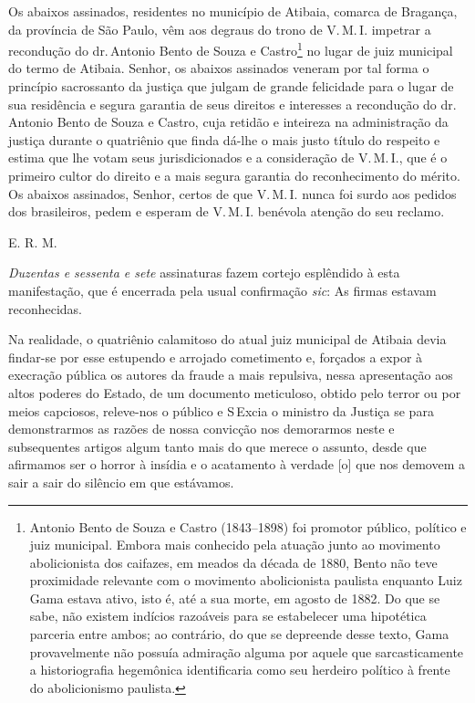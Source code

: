 Os abaixos assinados, residentes no município de Atibaia, comarca de
Bragança, da província de São Paulo, vêm aos degraus do trono de V.\,M.\,I.
impetrar a recondução do dr.\,Antonio Bento de Souza e Castro\footnote{
  Antonio Bento de Souza e Castro (1843--1898) foi promotor público,
  político e juiz municipal. Embora mais conhecido pela atuação junto ao
  movimento abolicionista dos caifazes, em meados da década de 1880,
  Bento não teve proximidade relevante com o movimento abolicionista
  paulista enquanto Luiz Gama estava ativo, isto é, até a sua morte, em
  agosto de 1882. Do que se sabe, não existem indícios razoáveis para se
  estabelecer uma hipotética parceria entre ambos; ao contrário, do que
  se depreende desse texto, Gama provavelmente não possuía admiração
  alguma por aquele que sarcasticamente a historiografia hegemônica
  identificaria como seu herdeiro político à frente do abolicionismo
  paulista.} no lugar de juiz municipal do termo de Atibaia. Senhor, os
abaixos assinados veneram por tal forma o princípio sacrossanto da
justiça que julgam de grande felicidade para o lugar de sua residência e
segura garantia de seus direitos e interesses a recondução do dr.\,Antonio Bento de Souza e Castro, cuja retidão e inteireza na
administração da justiça durante o quatriênio que finda dá-lhe o mais
justo título do respeito e estima que lhe votam seus jurisdicionados e a
consideração de V.\,M.\,I., que é o primeiro cultor do direito e a mais
segura garantia do reconhecimento do mérito. Os abaixos assinados,
Senhor, certos de que V.\,M.\,I. nunca foi surdo aos pedidos dos
brasileiros, pedem e esperam de V.\,M.\,I. benévola atenção do seu
reclamo.

E. R. M.

\emph{Duzentas e sessenta e sete} assinaturas fazem cortejo esplêndido à
esta manifestação, que é encerrada pela usual confirmação \emph{sic}: As
firmas estavam reconhecidas.

Na realidade, o quatriênio calamitoso do atual juiz municipal de Atibaia
devia findar-se por esse estupendo e arrojado cometimento e, forçados a
expor à execração pública os autores da fraude a mais repulsiva, nessa
apresentação aos altos poderes do Estado, de um documento meticuloso,
obtido pelo terror ou por meios capciosos, releve-nos o público e S\,Excia o ministro da Justiça se para demonstrarmos as razões de nossa
convicção nos demorarmos neste e subsequentes artigos algum tanto mais
do que merece o assunto, desde que afirmamos ser o horror à insídia e o
acatamento à verdade {[}o{]} que nos demovem a sair a sair do silêncio
em que estávamos.

